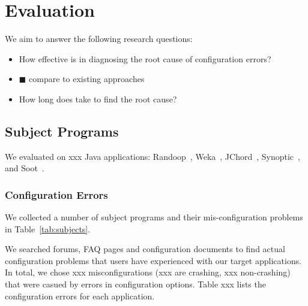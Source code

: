 \section{Evaluation}
\label{sec:evaluation}


We aim to answer the following research questions:

\begin{itemize}
\item How effective is \ourtool in diagnosing the root cause of
configuration errors?

\item $\blacksquare$ compare to existing approaches

\item How long does \ourtool take to find the root cause?

\end{itemize}

\subsection{Subject Programs}

We evaluated \ourtool on xxx Java applications: Randoop~\cite{randoop},
Weka~\cite{weka}, JChord~\cite{jchord}, Synoptic~\cite{synoptic},
and Soot~\cite{soot}.

\subsubsection{Configuration Errors}

We collected a number of subject programs and their mis-configuration problems in
Table~\ref{tab:subjects}.

We searched forums, FAQ pages and configuration documents to find
actual configuration problems that users have experienced with our
target applications. In total, we chose xxx misconfigurations (xxx
are crashing, xxx non-crashing) that were casued by errors in
configuration options. Table xxx lists the configuration errors for each application.

